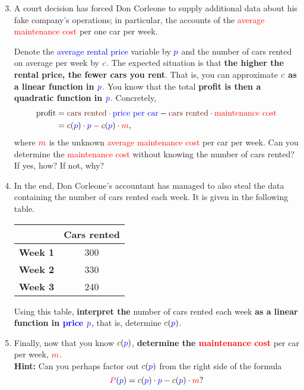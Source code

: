 \documentclass[a4paper,11pt]{article}
\newcommand{\clr}{\textcolor{red}}
\newcommand{\clb}{\textcolor{blue}}
\newcommand{\clm}{\textcolor{magenta}}
\newcommand{\clbr}{\textcolor{Sepia}}
\begin{document}
\begin{enumerate}
 \setcounter{enumi}{2}
 \item A court decision has forced Don Corleone to supply additional data about
  his fake company's operations; in particular, the accounts of the \clr{average
  maintenance cost} per one car per week.
 
  Denote the \clb{average rental price} variable by $\clb{p}$ and the
  \clbr{number of cars rented} on average per week by $\clbr{c}$. The expected
  situation is that \textbf{the higher the rental price, the fewer cars you
  rent}. That is, you can approximate \textbf{$\clbr{c}$ as a linear function in
  $\clb{p}$}. You know that the total \textbf{profit is then a quadratic
  function in $\clb{p}$}. Concretely,
  \begin{equation*}
   \begin{split}
    \text{profit} &= \text{\clbr{cars rented}} \cdot \text{\clb{price per car}} -
    \text{\clbr{cars rented}} \cdot \text{\clr{maintenance cost}}\\
                  &= \clbr{c}(\clb{p}) \cdot \clb{p} - \clbr{c}(\clb{p}) \cdot
                  \clr{m}, \\
   \end{split}
  \end{equation*}
  where $\clr{m}$ is the unknown \clr{average maintenance cost} per car per
  week. Can you determine the \clr{maintenance cost} without knowing the
  \clbr{number of cars rented}? If yes, how? If not, why?
 \item In the end, Don Corleone's accountant has managed to also steal the data
  containing the \clbr{number of cars rented each week}. It is given in the
  following table.
  \begin{table}[h]
   \centering
   \begin{tabular}{c|c}
    & \textbf{\clbr{Cars rented}} \\
    \toprule
    \textbf{Week 1} & 300\\
    \textbf{Week 2} & 330\\
    \textbf{Week 3} & 240
   \end{tabular}
  \end{table}
 
  Using this table, \textbf{interpret the} \clbr{number of cars rented} each
  week \textbf{as a linear function in \clb{price} $\clb{p}$}, that is, determine
  $\clbr{c}(\clb{p})$.
 \item Finally, now that you know $\clbr{c}(\clb{p})$, \textbf{determine the
  \clr{maintenance cost}} per car per week, $\clr{m}$.\\
  \textbf{Hint:} Can you perhaps factor out $\clbr{c}(\clb{p})$ from the right
  side of the formula
  \[
   \clm{P}(\clb{p}) = \clbr{c}(\clb{p}) \cdot \clb{p} - \clbr{c}(\clb{p}) \cdot
   \clr{m}?
  \]
\end{enumerate}
\clearpage
\null
\clearpage
\end{document}
